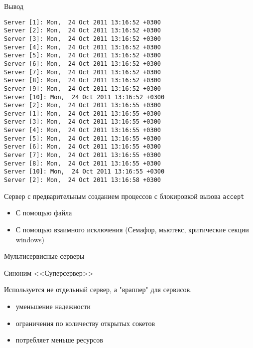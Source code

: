\begin{frame}[fragile]
	\tiny
\end{frame}

\begin{frame}[fragile]
	\tiny
\end{frame}

\begin{frame}[fragile]
	\tiny
\end{frame}

\begin{frame}[fragile]
{Вывод}
	\scriptsize
	\begin{verbatim}
Server [1]: Mon,  24 Oct 2011 13:16:52 +0300
Server [2]: Mon,  24 Oct 2011 13:16:52 +0300
Server [3]: Mon,  24 Oct 2011 13:16:52 +0300
Server [4]: Mon,  24 Oct 2011 13:16:52 +0300
Server [5]: Mon,  24 Oct 2011 13:16:52 +0300
Server [6]: Mon,  24 Oct 2011 13:16:52 +0300
Server [7]: Mon,  24 Oct 2011 13:16:52 +0300
Server [8]: Mon,  24 Oct 2011 13:16:52 +0300
Server [9]: Mon,  24 Oct 2011 13:16:52 +0300
Server [10]: Mon,  24 Oct 2011 13:16:52 +0300
Server [2]: Mon,  24 Oct 2011 13:16:55 +0300
Server [1]: Mon,  24 Oct 2011 13:16:55 +0300
Server [3]: Mon,  24 Oct 2011 13:16:55 +0300
Server [4]: Mon,  24 Oct 2011 13:16:55 +0300
Server [5]: Mon,  24 Oct 2011 13:16:55 +0300
Server [6]: Mon,  24 Oct 2011 13:16:55 +0300
Server [7]: Mon,  24 Oct 2011 13:16:55 +0300
Server [8]: Mon,  24 Oct 2011 13:16:55 +0300
Server [10]: Mon,  24 Oct 2011 13:16:55 +0300
Server [2]: Mon,  24 Oct 2011 13:16:58 +0300
	\end{verbatim}
\end{frame}


\begin{frame}{Сервер с предварительным созданием процессов с блокировкой вызова {\tt accept}}

	\begin{itemize}
		\item С помощью файла
		\item С помощью взаимного исключения (Семафор,  мьютекс,  критические секции windows)
	\end{itemize}
\end{frame}

\begin{frame}{Мультисервисные серверы}

Синоним <<Суперсервер>>

Используется не отдельный сервер, а "враппер" для сервисов.
	\begin{itemize}
		\item уменьшение надежности
		\item ограничения по количеству открытых сокетов
		\item потребляет меньше ресурсов
	\end{itemize}
\end{frame}

